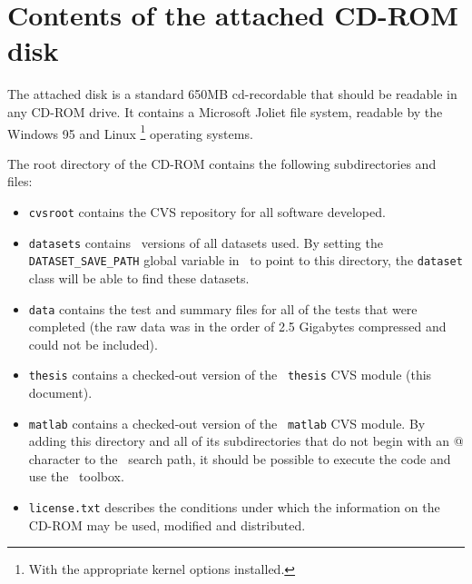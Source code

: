 
\chapter{Contents of the attached CD-ROM disk}
\label{appendix:cdrom}

The attached disk is a standard 650MB cd-recordable that should be
readable in any CD-ROM drive.  It contains a Microsoft Joliet file
system, readable by the Windows 95 and Linux%
\footnote{With the appropriate kernel options installed.}
operating systems.

The root directory of the CD-ROM contains the following subdirectories
and files:
%
\begin{itemize}
\item	{\tt cvsroot} contains the CVS repository for all software
	developed.
\item	{\tt datasets} contains \MATLAB\ versions of all datasets
	used.  By setting the {\tt DATASET\_SAVE\_PATH} global variable
	in \MATLAB\ to point to this directory, the {\tt dataset}
	class will be able to find these datasets.
\item	{\tt data} contains the test and summary files for all of the
	tests that were completed (the raw data was in the order of
	2.5 Gigabytes compressed and could not be included).
\item	{\tt thesis} contains a checked-out version of the {\tt
	thesis} CVS module (this document).
\item	{\tt matlab} contains a checked-out version of the {\tt
	matlab} CVS module.  By adding this directory and all of its
	subdirectories that do not begin with an @ character to the
	\MATLAB\ search path, it should be possible to execute the
	code and use the \MATLAB\ toolbox.
\item	{\tt license.txt} describes the conditions under which the
	information on the CD-ROM may be used, modified and
	distributed.
\end{itemize}
